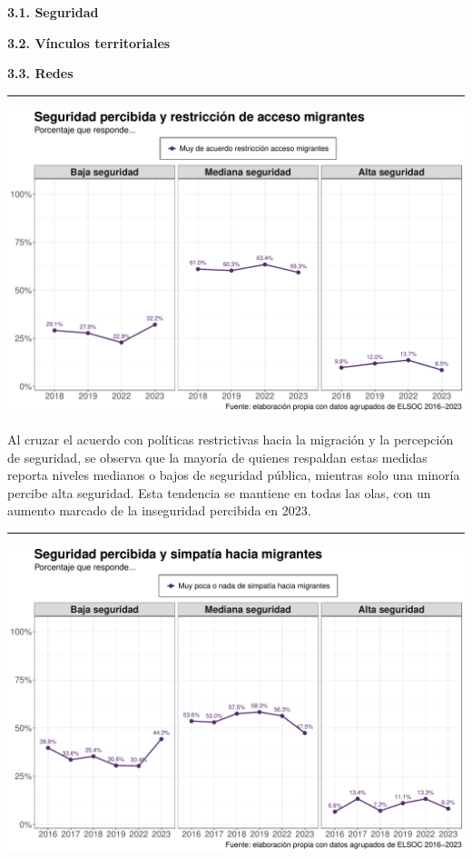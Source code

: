 \documentclass[
  spanish,
  letterpaper,
  DIV=11,
  numbers=noendperiod,
  oneside]{scrartcl}
\begin{document}
{\textbf{3.1. Seguridad}}

{\textbf{3.2. Vínculos territoriales}}

{\textbf{3.3. Redes}}

\begin{center}\rule{0.5\linewidth}{0.5pt}\end{center}

\begin{center}
\includegraphics[width=1\linewidth,height=\textheight,keepaspectratio]{cep_2025_files/figure-pdf/unnamed-chunk-4-1.pdf}
\end{center}

Al cruzar el acuerdo con políticas restrictivas hacia la migración y la
percepción de seguridad, se observa que la mayoría de quienes respaldan
estas medidas reporta niveles medianos o bajos de seguridad pública,
mientras solo una minoría percibe alta seguridad. Esta tendencia se
mantiene en todas las olas, con un aumento marcado de la inseguridad
percibida en 2023.

\begin{center}\rule{0.5\linewidth}{0.5pt}\end{center}

\begin{center}
\includegraphics[width=1\linewidth,height=\textheight,keepaspectratio]{cep_2025_files/figure-pdf/unnamed-chunk-5-1.pdf}
\end{center}
\end{document}
